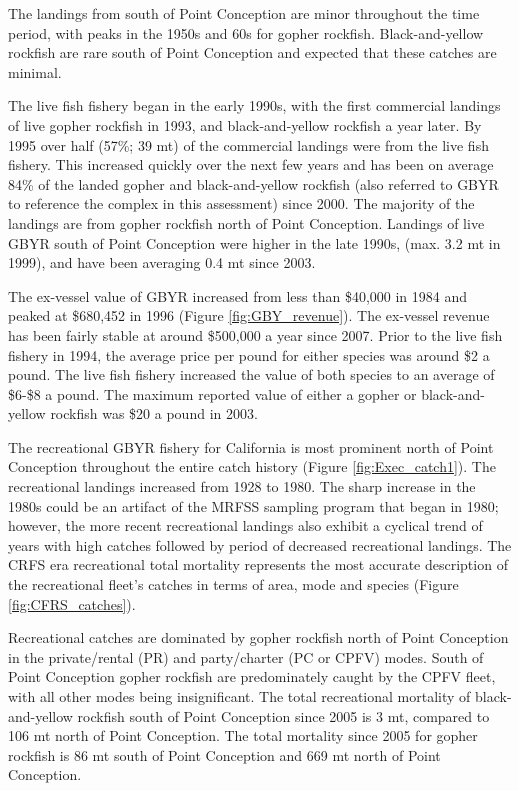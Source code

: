 \documentclass[12pt,]{article}
\begin{document}
The landings from south of Point Conception are minor throughout the
time period, with peaks in the 1950s and 60s for gopher rockfish.
Black-and-yellow rockfish are rare south of Point Conception and
expected that these catches are minimal.

The live fish fishery began in the early 1990s, with the first
commercial landings of live gopher rockfish in 1993, and
black-and-yellow rockfish a year later. By 1995 over half (57\%; 39 mt)
of the commercial landings were from the live fish fishery. This
increased quickly over the next few years and has been on average 84\%
of the landed gopher and black-and-yellow rockfish (also referred to
GBYR to reference the complex in this assessment) since 2000. The
majority of the landings are from gopher rockfish north of Point
Conception. Landings of live GBYR south of Point Conception were higher
in the late 1990s, (max. 3.2 mt in 1999), and have been averaging 0.4 mt
since 2003.

The ex-vessel value of GBYR increased from less than \$40,000 in 1984
and peaked at \$680,452 in 1996 (Figure \ref{fig:GBY_revenue}). The
ex-vessel revenue has been fairly stable at around \$500,000 a year
since 2007. Prior to the live fish fishery in 1994, the average price
per pound for either species was around \$2 a pound. The live fish
fishery increased the value of both species to an average of \$6-\$8 a
pound. The maximum reported value of either a gopher or black-and-yellow
rockfish was \$20 a pound in 2003.

The recreational GBYR fishery for California is most prominent north of
Point Conception throughout the entire catch history (Figure
\ref{fig:Exec_catch1}). The recreational landings increased from 1928 to
1980. The sharp increase in the 1980s could be an artifact of the MRFSS
sampling program that began in 1980; however, the more recent
recreational landings also exhibit a cyclical trend of years with high
catches followed by period of decreased recreational landings. The CRFS
era recreational total mortality represents the most accurate
description of the recreational fleet's catches in terms of area, mode
and species (Figure \ref{fig:CFRS_catches}).

Recreational catches are dominated by gopher rockfish north of Point
Conception in the private/rental (PR) and party/charter (PC or CPFV)
modes. South of Point Conception gopher rockfish are predominately
caught by the CPFV fleet, with all other modes being insignificant. The
total recreational mortality of black-and-yellow rockfish south of Point
Conception since 2005 is 3 mt, compared to 106 mt north of Point
Conception. The total mortality since 2005 for gopher rockfish is 86 mt
south of Point Conception and 669 mt north of Point Conception.
\end{document}
